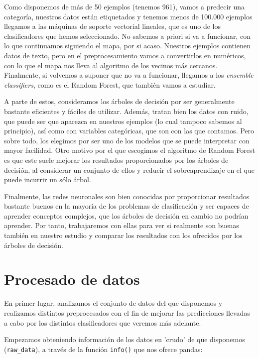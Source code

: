 \documentclass[a4paper,11pt]{article}
\begin{document}
Como disponemos de más de 50 ejemplos (tenemos 961), vamos a predecir una categoría, nuestros datos están etiquetados y tenemos menos de 100.000 ejemplos llegamos a las máquinas de soporte vectorial lineales, que es uno de los clasificadores que hemos seleccionado. No sabemos a priori si va a funcionar, con lo que continuamos siguiendo el mapa, por si acaso. Nuestros ejemplos contienen datos de texto, pero en el preprocesamiento vamos a convertirlos en numéricos, con lo que el mapa nos lleva al algoritmo de los vecinos más cercanos. Finalmente, si volvemos a suponer que no va a funcionar, llegamos a los \textit{ensemble classifiers}, como es el Random Forest, que también vamos a estudiar. 

A parte de estos, consideramos los árboles de decisión por ser generalmente bastante eficientes y fáciles de utilizar. Además, tratan bien los datos con ruido, que puede ser que aparezca en nuestros ejemplos (lo cual tampoco sabemos al principio), así como con variables categóricas, que son con las que contamos. Pero sobre todo, los elegimos por ser uno de los modelos que se puede interpretar con mayor facilidad. Otro motivo por el que escogimos el algoritmo de Random Forest es que este suele mejorar los resultados proporcionados por los árboles de decisión, al considerar un conjunto de ellos y reducir el sobreaprendizaje en el que puede incurrir un sólo árbol. 

Finalmente, las redes neuronales son bien conocidas por proporcionar resultados bastante buenos en la mayoría de los problemas de clasificación y ser capaces de aprender conceptos complejos, que los árboles de decisión en cambio no podrían aprender. Por tanto, trabajaremos con ellas para ver si realmente son buenas también en nuestro estudio y comparar los resultados con los ofrecidos por los árboles de decisión. 


\newpage
\section{Procesado de datos}

En primer lugar, analizamos el conjunto de datos del que disponemos y realizamos distintos preprocesados con el fin de mejorar las predicciones llevadas a cabo por los distintos clasificadores que veremos más adelante. 


Empezamos obteniendo información de los datos en 'crudo' de que disponemos (\texttt{raw_data}), a través de la función \texttt{info()} que nos ofrece pandas:
\end{document}
